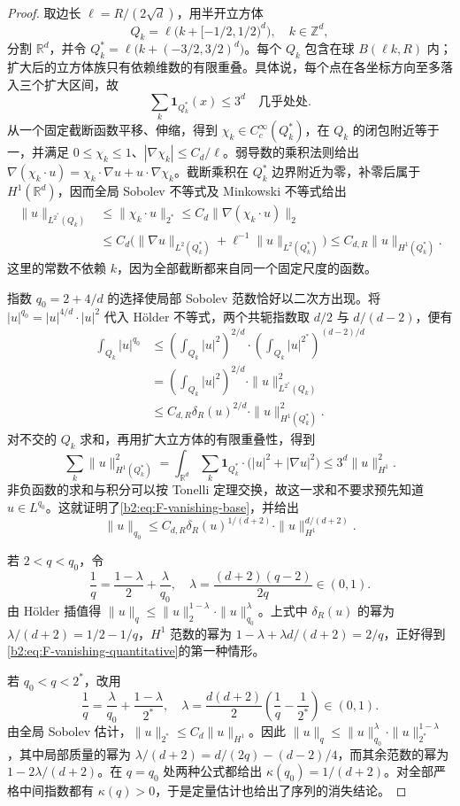 \begin{proof}
取边长 \(\ell=R/(2\sqrt d)\)，用半开立方体
\[
 Q_k=\ell\bigl(k+[-1/2,1/2)^d\bigr),
 \quad k\in\mathbb Z^d,
\]
分割 \(\mathbb R^d\)，并令
\(Q_k^*=\ell\bigl(k+(-3/2,3/2)^d\bigr)\)。每个 \(Q_k\) 包含在球 \(B(\ell k,R)\) 内；扩大后的立方体族只有依赖维数的有限重叠。具体说，每个点在各坐标方向至多落入三个扩大区间，故
\[
 \sum_k\mathbf1_{Q_k^*}(x)\le3^d
 \quad\text{几乎处处}.
\]
从一个固定截断函数平移、伸缩，得到
\(\chi_k\in C_c^\infty(Q_k^*)\)，在 \(Q_k\) 的闭包附近等于一，并满足
\(0\le\chi_k\le1\)、\(|\nabla\chi_k|\le C_d/\ell\)。弱导数的乘积法则给出
\(\nabla(\chi_k\cdot u)=\chi_k\cdot\nabla u+u\cdot\nabla\chi_k\)。截断乘积在 \(Q_k^*\) 边界附近为零，补零后属于 \(H^1(\mathbb R^d)\)，因而全局 Sobolev 不等式及 Minkowski 不等式给出
\[
 \begin{aligned}
 \|u\|_{L^{2^*}(Q_k)}
 &\le\|\chi_k\cdot u\|_{2^*}
 \le C_d\|\nabla(\chi_k\cdot u)\|_2\\
 &\le C_d\bigl(\|\nabla u\|_{L^2(Q_k^*)}
               +\ell^{-1}\|u\|_{L^2(Q_k^*)}\bigr)
 \le C_{d,R}\|u\|_{H^1(Q_k^*)}.
 \end{aligned}
\]
这里的常数不依赖 \(k\)，因为全部截断都来自同一个固定尺度的函数。

指数 \(q_0=2+4/d\) 的选择使局部 Sobolev 范数恰好以二次方出现。将
\(|u|^{q_0}=|u|^{4/d}\cdot|u|^2\) 代入 Hölder 不等式，两个共轭指数取 \(d/2\) 与 \(d/(d-2)\)，便有
\[
 \begin{aligned}
 \int_{Q_k}|u|^{q_0}
 &\le\left(\int_{Q_k}|u|^2\right)^{2/d}
       \cdot\left(\int_{Q_k}|u|^{2^*}\right)^{(d-2)/d}\\
 &=\left(\int_{Q_k}|u|^2\right)^{2/d}
       \cdot\|u\|_{L^{2^*}(Q_k)}^2\\
 &\le C_{d,R}\delta_R(u)^{2/d}\cdot\|u\|_{H^1(Q_k^*)}^2.
 \end{aligned}
\]
对不交的 \(Q_k\) 求和，再用扩大立方体的有限重叠性，得到
\[
 \sum_k\|u\|_{H^1(Q_k^*)}^2
 =\int_{\mathbb R^d}\sum_k\mathbf1_{Q_k^*}
       \cdot\bigl(|u|^2+|\nabla u|^2\bigr)
 \le3^d\|u\|_{H^1}^2.
\]
非负函数的求和与积分可以按 Tonelli 定理交换，故这一求和不要求预先知道 \(u\in L^{q_0}\)。这就证明了\eqref{b2:eq:F-vanishing-base}，并给出
\[
 \|u\|_{q_0}\le C_{d,R}\delta_R(u)^{1/(d+2)}
                         \cdot\|u\|_{H^1}^{d/(d+2)}.
\]

若 \(2<q<q_0\)，令
\[
 \frac1q=\frac{1-\lambda}{2}+\frac\lambda{q_0},
 \quad
 \lambda=\frac{(d+2)(q-2)}{2q}\in(0,1).
\]
由 Hölder 插值得
\(\|u\|_q\le\|u\|_2^{1-\lambda}\cdot\|u\|_{q_0}^{\lambda}\)。上式中 \(\delta_R(u)\) 的幂为
\(\lambda/(d+2)=1/2-1/q\)，\(H^1\) 范数的幂为
\(1-\lambda+\lambda d/(d+2)=2/q\)，正好得到\eqref{b2:eq:F-vanishing-quantitative}的第一种情形。

若 \(q_0<q<2^*\)，改用
\[
 \frac1q=\frac\lambda{q_0}+\frac{1-\lambda}{2^*},
 \quad
 \lambda=\frac{d(d+2)}2
              \left(\frac1q-\frac1{2^*}\right)\in(0,1).
\]
由全局 Sobolev 估计，\(\|u\|_{2^*}\le C_d\|u\|_{H^1}\)。因此
\(\|u\|_q\le\|u\|_{q_0}^{\lambda}\cdot\|u\|_{2^*}^{1-\lambda}\)，其中局部质量的幂为
\(\lambda/(d+2)=d/(2q)-(d-2)/4\)，而其余范数的幂为 \(1-2\lambda/(d+2)\)。在 \(q=q_0\) 处两种公式都给出 \(\kappa(q_0)=1/(d+2)\)。对全部严格中间指数都有 \(\kappa(q)>0\)，于是定量估计也给出了序列的消失结论。
\end{proof}

